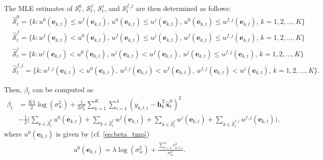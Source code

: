 \documentclass[onecolumn]{IEEEtran}
\begin{document}
The MLE estimates of $\mathcal{S}_t^0$, $\mathcal{S}_t^f$, $\mathcal{S}_t^j$, and $\mathcal{S}_t^{f,j}$ are then determined as follows:
\begin{align} \nonumber
&\hat{\mathcal{S}}_t^0 = \Big\{k: u^0(\mathbf{e}_{k,t}) \leq u^f(\mathbf{e}_{k,t}), \, u^0(\mathbf{e}_{k,t}) \leq u^j(\mathbf{e}_{k,t}), \, u^0(\mathbf{e}_{k,t}) \leq  u^{f,j}(\mathbf{e}_{k,t}), \, k = 1, 2, \dots, K \Big\} \\ \nonumber
&\hat{\mathcal{S}}_t^f = \Big\{ k: u^f(\mathbf{e}_{k,t}) < u^0(\mathbf{e}_{k,t}), \, u^f(\mathbf{e}_{k,t}) \leq u^j(\mathbf{e}_{k,t}), \, u^f(\mathbf{e}_{k,t}) \leq u^{f,j}(\mathbf{e}_{k,t}), \, k = 1, 2, \dots, K \Big\} \\ \nonumber
&\hat{\mathcal{S}}_t^j = \Big\{ k: u^j(\mathbf{e}_{k,t}) < u^0(\mathbf{e}_{k,t}), \, u^j(\mathbf{e}_{k,t}) < u^f(\mathbf{e}_{k,t}), \, u^j(\mathbf{e}_{k,t}) \leq u^{f,j}(\mathbf{e}_{k,t}), \, k = 1, 2, \dots, K \Big\} \\  \nonumber
&\hat{\mathcal{S}}_t^{f,j} = \Big\{ k: u^{f,j}(\mathbf{e}_{k,t}) < u^0(\mathbf{e}_{k,t}), \, u^{f,j}(\mathbf{e}_{k,t}) < u^f(\mathbf{e}_{k,t}), \, u^{f,j}(\mathbf{e}_{k,t}) < u^j(\mathbf{e}_{k,t}), \, k = 1, 2, \dots, K \Big\}.
\end{align}

Then, $\beta_t$ can be computed as
\begin{align} \nonumber
\beta_t &=  \frac{K \lambda}{2} \log(\sigma_w^2) + \frac{1}{2 \sigma_w^2} \sum_{k=1}^{K} \sum_{i=1}^{\lambda} (y_{k,t,i} - \mathbf{h}_k^\mathrm{T} \hat{\mathbf{x}}_t^0)^2 \\ \nonumber
&- \frac{1}{2} \bigg( \sum_{k \in \hat{\mathcal{S}}_t^0} u^0(\mathbf{e}_{k,t}) + \sum_{k \in \hat{\mathcal{S}}_t^f} u^f(\mathbf{e}_{k,t})
+ \sum_{k \in \hat{\mathcal{S}}_t^j} u^j(\mathbf{e}_{k,t}) + \sum_{k \in \hat{\mathcal{S}}_t^{f,j}} u^{f,j}(\mathbf{e}_{k,t}) \bigg),
\end{align}
where $u^0(\mathbf{e}_{k,t})$ is given by (cf. \eqref{eq:beta_tmp})
\begin{gather}\label{eq:u0} \nonumber
u^0(\mathbf{e}_{k,t}) =  \lambda \log(\sigma_w^2) + \frac{\sum_{i=1}^{\lambda} e_{k,t,i}^2}{\sigma_w^2}.
\end{gather}
\end{document}
